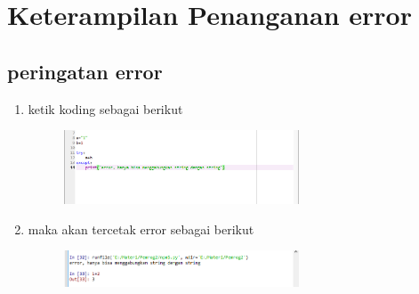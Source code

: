 \chapter*{Keterampilan Penanganan error}
\section*{peringatan error} 

\begin{enumerate}
   

\item ketik koding sebagai berikut
	\begin{figure} [h]
	\includegraphics[width=7cm]{npm/npm10.png}
	\centering
	\end{figure}
	
	
	
 \item maka akan tercetak error sebagai berikut
 \begin{figure} [h]
	\includegraphics[width=7cm]{npm/npm11.png}
	\centering
	\end{figure}
 
	
	\end{enumerate}